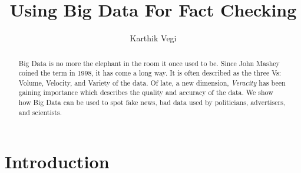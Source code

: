 \documentclass[sigconf]{acmart}
\begin{document}
\title{Using Big Data For Fact Checking}

\author{Karthik Vegi}


\renewcommand{\shortauthors}{kvegi}


\begin{abstract}
Big Data is no more the elephant in the room it once used to be. Since John Mashey coined the term in 1998, it has come a long way. It is often described as the three Vs: Volume, Velocity, and Variety of the data. Of late, a new dimension, \textit{Veracity} has been gaining importance which describes the quality and accuracy of the data. We show how Big Data can be used to spot fake news, bad data used by politicians, advertisers, and scientists.
\end{abstract}


\maketitle

\section{Introduction}
\end{document}
